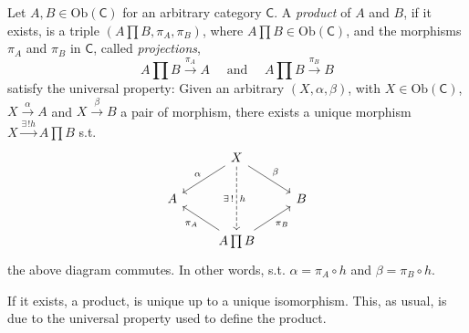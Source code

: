 \begin{defn}[Product]
	Let $A, B \in \mathrm{Ob} \left(\mathsf{C}\right)$ for an arbitrary category $\mathsf{C}$.
	A {\em product} of $A$ and $B$, if it exists, is a triple $\left(A \prod B, \pi_A, \pi_B \right)$, where $A \prod B \in \mathrm{Ob} \left(\mathsf{C}\right)$, and the morphisms $\pi_A$ and $\pi_B$ in $\mathsf{C}$, called {\em projections}, 
	 \begin{equation}
	A \prod B \xrightarrow{\pi_A} A \quad \text{ and } \quad A \prod B \xrightarrow{\pi_B} B
	\end{equation} 
	satisfy the universal property:
	Given an arbitrary $\left(X, \alpha, \beta\right)$, with $X \in \mathrm{Ob} \left(\mathsf{C}\right)$, $X \xrightarrow{\alpha} A$ and $X \xrightarrow{\beta} B$ a pair of morphism, there exists a unique morphism $X \xrightarrow{\exists\, ! h} A \prod B$ s.t.
	\begin{equation}
	\begin{tikzcd}
		& X \arrow[ld, "\alpha"', rightarrow] \arrow[rd, "\beta", rightarrow] \arrow[dd, "h", "\exists\, !"', dashrightarrow] \\
		A & & B\\
		  & A \prod B \arrow[lu, "\pi_A", rightarrow] \arrow[ru, "\pi_B"', rightarrow] &
	\end{tikzcd}
	\end{equation} 
	the above diagram commutes.
	In other words, s.t. $\alpha = \pi_A \circ h$ and $\beta = \pi_B \circ h$.
\end{defn}

\begin{rem}
	If it exists, a product, is unique up to a unique isomorphism.
	This, as usual, is due to the universal property used to define the product.
\end{rem}


